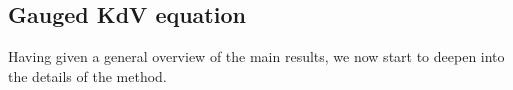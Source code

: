 \documentclass[a4paper,
11pt,  reqno]{amsart}
\newcommand{\5}{\textup{V}}
\newcommand{\andreia}[1]{\marginpar{\color{purple} $\Leftarrow\Leftarrow\Leftarrow$}{\smallskip \noi\color{purple}ANDREIA: #1}\smallskip}
\newcommand{\noi}{\noindent}
\newcommand{\FL}{\mathcal{F} L}
\theoremstyle{remark}
\newcommand{\R}{\mathbb{R}}
\newcommand{\Gc}{\mathcal{G}}
\numberwithin{equation}{section}
\numberwithin{theorem}{section}
\begin{document}
\bigskip









\subsection{Gauged KdV equation}

Having given a general overview of the main results, we now start to deepen into the details of the method. 
\end{document}
